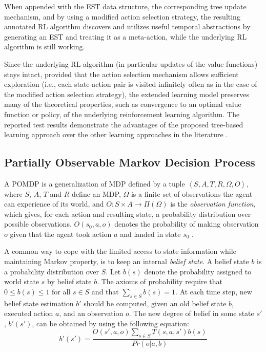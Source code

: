 \documentclass[10pt, conference, compsocconf]{IEEEtran}
\begin{document}
When appended with the EST data structure, the corresponding tree update mechanism, and by using a modified action selection strategy, the resulting annotated RL algorithm discovers and utilizes useful temporal abstractions by generating an EST and treating it as a meta-action, while the underlying RL algorithm is still working.

Since the underlying RL algorithm (in particular updates of the value functions) stays intact, provided that the action selection mechanism allows sufficient exploration (i.e., each state-action pair is visited infinitely often as in the case of the modified action selection strategy), the extended learning model preserves many of the theoretical properties, such as convergence to an optimal value function or policy, of the underlying reinforcement learning algorithm. 
The reported test results demonstrate the advantages of the proposed tree-based learning approach over the other learning approaches in the literature \cite{girgin_improving_2010}.


\subsection{Partially Observable Markov Decision Process}
\label{sec:POMDP}

A POMDP is a generalization of MDP defined by a tuple $\left\langle S,A,T,R,\Omega,O \right\rangle $, where $S$, $A$, $T$ and $R$ define an MDP, $\Omega$ is a finite set of observations the agent can experience of its world, and $O:S \times A \rightarrow \Pi(\Omega)$ is the \textit{observation function}, which gives, for each action and resulting state, a probability distribution over possible observations. $O(s_0, a, o)$ denotes the probability of making observation $o$ given that the agent took action $a$ and landed in state $s_0$ \cite{kaelbling_planning_1998}.

A common way to cope with the limited access to state information while maintaining Markov property, is to keep an internal \textit{belief state}. A belief state $b$ is a probability distribution over $S$. Let $b(s)$ denote the probability assigned to world state $s$ by belief state $b$. The axioms of probability
require that $0 \leq b(s) \leq 1$ for all $s \in S$ and that $\sum_{s \in S} b(s) = 1$. At each time step, new belief state estimation $b'$ should be computed, given an old belief state $b$, executed action $a$, and an observation $o$. The new degree of belief in some state $s'$, $b'(s')$, can be obtained by using the following equation:
\begin{displaymath}
b'(s') = \frac{O(s',a,o) \sum_{s \in S} T(s,a,s')b(s)}{Pr(o|a,b)}
\end{displaymath}
\end{document}
